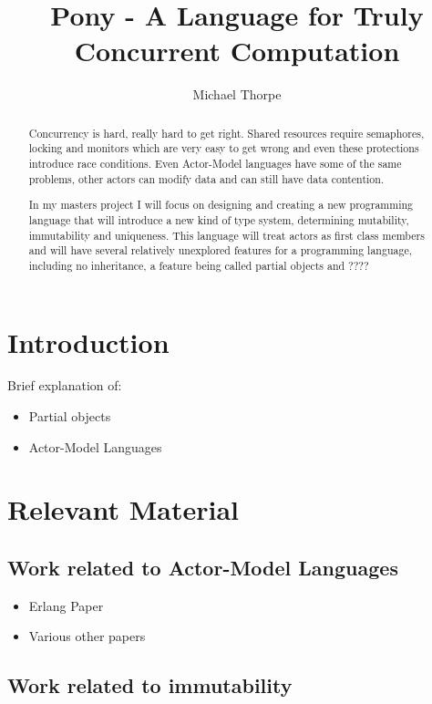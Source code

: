 \documentclass{article}
\begin{document}
\title{Pony - A Language for Truly Concurrent Computation}

\author{Michael Thorpe}

\maketitle

\begin{abstract}
Concurrency is hard, really hard to get right. Shared resources require semaphores, locking and monitors which are very easy to get wrong and even these protections introduce race conditions. Even Actor-Model languages have some of the same problems, other actors can modify data and can still have data contention.

In my masters project I will focus on designing and creating a new programming language that will introduce a new kind of type system, determining mutability, immutability and uniqueness. This language will treat actors as first class members and will have several relatively unexplored features for a programming language, including no inheritance, a feature being called partial objects and ????
\end{abstract}

\section{Introduction}

Brief explanation of:
\begin{itemize}
\item Partial objects
\item Actor-Model Languages
\end{itemize}

\section{Relevant Material}

\subsection{Work related to Actor-Model Languages}

\begin{itemize}
	\item Erlang Paper
	\item Various other papers
\end{itemize}

\subsection{Work related to immutability}
\end{document}
